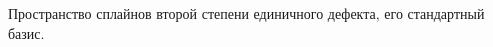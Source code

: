 \documentclass[__main__.tex]{subfiles}
\begin{document}
Пространство сплайнов второй степени единичного дефекта, его стандартный базис.
\end{document}
